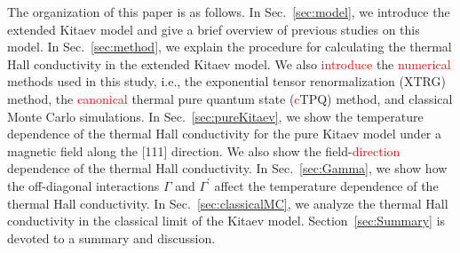 \documentclass[twocolumn,superscriptaddress,showpacs, longbibliography, aps, prb]{revtex4-2}
\newcommand{\red}[1]{\textcolor{red}{#1}}
\begin{document}
The organization of this paper is as follows. 
In Sec.~\ref{sec:model}, we introduce the extended Kitaev model and
give a brief overview of previous studies on %
this model.
In Sec.~\ref{sec:method}, we explain %
the procedure for calculating the
thermal Hall conductivity %
in the extended Kitaev model.
We also %
\red{introduce} the \red{numerical} methods used in this study, i.e.,
the exponential tensor renormalization (XTRG) method,
the \red{canonical} thermal pure quantum state (\red{c}TPQ) method, and
classical Monte Carlo simulations.
In Sec.~\ref{sec:pureKitaev}, we show the temperature
dependence of the thermal Hall conductivity for the pure Kitaev model under a magnetic field
along the [111] direction. We also show the field-\red{direction} %
dependence 
of the thermal Hall conductivity.
In Sec.~\ref{sec:Gamma}, we show how the off-diagonal interactions
$\Gamma$ and $\Gamma^{\prime}$ %
affect the temperature
dependence of the thermal Hall conductivity.
In Sec.~\ref{sec:classicalMC}, we analyze 
the thermal Hall conductivity in the classical limit of the Kitaev model.
Section~\ref{sec:Summary} is devoted to a summary and discussion.
\end{document}
